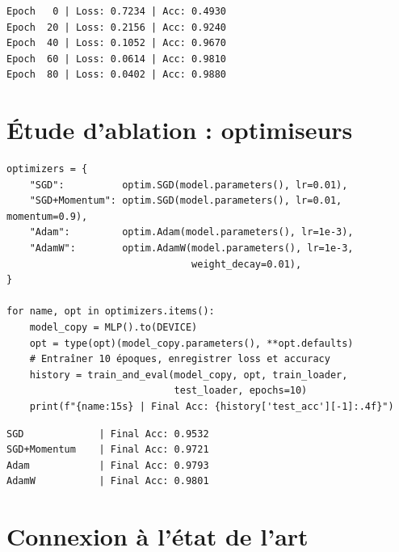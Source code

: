 \begin{codeoutput}
\begin{verbatim}
Epoch   0 | Loss: 0.7234 | Acc: 0.4930
Epoch  20 | Loss: 0.2156 | Acc: 0.9240
Epoch  40 | Loss: 0.1052 | Acc: 0.9670
Epoch  60 | Loss: 0.0614 | Acc: 0.9810
Epoch  80 | Loss: 0.0402 | Acc: 0.9880
\end{verbatim}
\end{codeoutput}

\section{\'Etude d'ablation : optimiseurs}
\label{sec:ablation_optim}

\begin{codeblock}[title=\textbf{Comparaison d'optimiseurs sur MNIST}]
\begin{verbatim}
optimizers = {
    "SGD":          optim.SGD(model.parameters(), lr=0.01),
    "SGD+Momentum": optim.SGD(model.parameters(), lr=0.01, momentum=0.9),
    "Adam":         optim.Adam(model.parameters(), lr=1e-3),
    "AdamW":        optim.AdamW(model.parameters(), lr=1e-3,
                                weight_decay=0.01),
}

for name, opt in optimizers.items():
    model_copy = MLP().to(DEVICE)
    opt = type(opt)(model_copy.parameters(), **opt.defaults)
    # Entraîner 10 époques, enregistrer loss et accuracy
    history = train_and_eval(model_copy, opt, train_loader,
                             test_loader, epochs=10)
    print(f"{name:15s} | Final Acc: {history['test_acc'][-1]:.4f}")
\end{verbatim}
\end{codeblock}

\begin{codeoutput}
\begin{verbatim}
SGD             | Final Acc: 0.9532
SGD+Momentum    | Final Acc: 0.9721
Adam            | Final Acc: 0.9793
AdamW           | Final Acc: 0.9801
\end{verbatim}
\end{codeoutput}

\section{Connexion \`a l'\'etat de l'art}
\label{sec:sota_optim}

